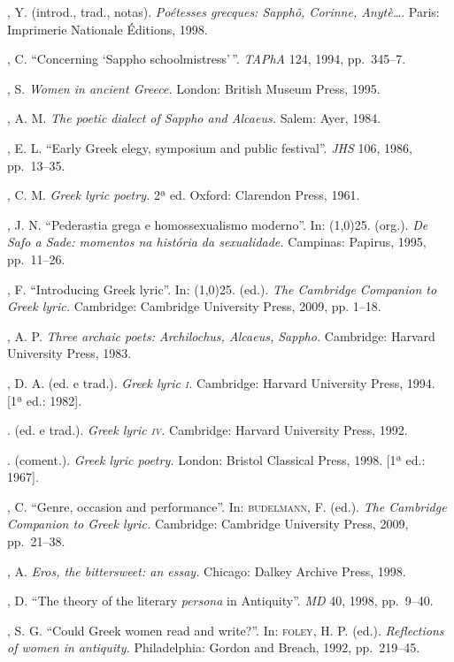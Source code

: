 \begin{bibliohedra}
, Y. (introd., trad., notas). \textit{Poétesses grecques:
Sapphô, Corinne, Anytè\ldots{}}. Paris: Imprimerie Nationale Éditions, 1998.

, C. “Concerning ‘Sappho schoolmistress’\,”. \textit{TAPhA} 124,
1994, pp.~345--7.

, S. \textit{Women in ancient Greece.} London: British Museum
Press, 1995.

, A. M. \textit{The poetic dialect of Sappho and Alcaeus.} Salem:
Ayer, 1984. 

, E. L. “Early Greek elegy, symposium and public festival”.
\textit{JHS} 106, 1986, pp.~13--35.

, C. M. \textit{Greek lyric poetry.} 2ª
ed. Oxford: Clarendon Press, 1961.

, J. N. “Pederastia grega e homossexualismo moderno”. In:
\line(1,0){25}. (org.). \textit{De Safo a Sade: momentos na história da
sexualidade.} Campinas: Papirus, 1995, pp.~11--26.

, F. “Introducing Greek lyric”. In:
\line(1,0){25}. (ed.). \textit{The Cambridge
Companion to Greek lyric.} Cambridge: Cambridge University Press, 2009, pp.
1--18.

, A. P. \textit{Three archaic poets: Archilochus, Alcaeus,
Sappho.} Cambridge: Harvard University Press, 1983. 

, D. A. (ed. e trad.). \textit{Greek lyric \textsc{i}.} Cambridge:
Harvard University Press, 1994. [1ª ed.: 1982].

\titidem. (ed. e trad.). \textit{Greek lyric \textsc{iv}.} Cambridge: Harvard
University Press, 1992.

\titidem. (coment.). \textit{Greek lyric poetry.} London: Bristol
Classical Press, 1998. [1ª ed.: 1967]. 

, C. “Genre, occasion and performance”. In:
\textsc{budelmann}, F. (ed.). \textit{The Cambridge Companion to Greek
lyric.} Cambridge: Cambridge University Press, 2009, pp.~21--38.

, A. \textit{Eros, the bittersweet: an essay.} Chicago:
Dalkey Archive Press, 1998.

, D. “The theory of the literary \textit{persona} in Antiquity”.
\textit{MD} 40, 1998, pp.~9--40.

, S. G. “Could Greek women read and write?”. In: \textsc{foley}, H.
P. (ed.). \textit{Reflections of women in antiquity.} Philadelphia: Gordon and
Breach, 1992, pp.~219--45.


\end{bibliohedra}
